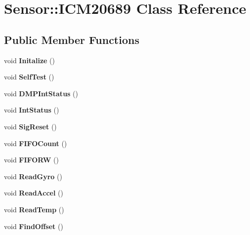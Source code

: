 \hypertarget{class_sensor_1_1_i_c_m20689}{}\section{Sensor\+::I\+C\+M20689 Class Reference}
\label{class_sensor_1_1_i_c_m20689}
\subsection*{Public Member Functions}
\begin{DoxyCompactItemize}
\item 
\mbox{\label{class_sensor_1_1_i_c_m20689_a90e6f7dfc54f0ef3ee7fc1e6b0b18b7b}} 
void {\bfseries Initalize} ()
\item 
\mbox{\label{class_sensor_1_1_i_c_m20689_a55a7d6deda2dc5f9a1e00c858247e914}} 
void {\bfseries Self\+Test} ()
\item 
\mbox{\label{class_sensor_1_1_i_c_m20689_abd8af511e7e1432cbc1e70f57b53b78e}} 
void {\bfseries D\+M\+P\+Int\+Status} ()
\item 
\mbox{\label{class_sensor_1_1_i_c_m20689_a0ba60845100ba43d604dadef5c8d1d50}} 
void {\bfseries Int\+Status} ()
\item 
\mbox{\label{class_sensor_1_1_i_c_m20689_ad9b051814387c3fe2eddd12bd0296cc8}} 
void {\bfseries Sig\+Reset} ()
\item 
\mbox{\label{class_sensor_1_1_i_c_m20689_a66566e68a5fd0076c7f4b5d3132087e3}} 
void {\bfseries F\+I\+F\+O\+Count} ()
\item 
\mbox{\label{class_sensor_1_1_i_c_m20689_ad61f9c2618a6093a61112de0088d8256}} 
void {\bfseries F\+I\+F\+O\+RW} ()
\item 
\mbox{\label{class_sensor_1_1_i_c_m20689_a3a7b53316fa068aed70a6d5302ef8374}} 
void {\bfseries Read\+Gyro} ()
\item 
\mbox{\label{class_sensor_1_1_i_c_m20689_a7b796f6241abe75cf5770996c2ab924d}} 
void {\bfseries Read\+Accel} ()
\item 
\mbox{\label{class_sensor_1_1_i_c_m20689_a195881ce5745637091b8ea07cac993be}} 
void {\bfseries Read\+Temp} ()
\item 
\mbox{\label{class_sensor_1_1_i_c_m20689_a36eedfde3208c98ddde584a1553febe1}} 
void {\bfseries Find\+Offset} ()
\end{DoxyCompactItemize}
